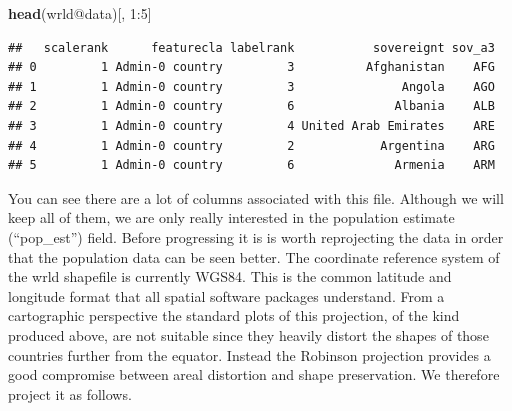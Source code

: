 \documentclass[]{article}
\newenvironment{Shaded}{}{}
\newcommand{\KeywordTok}[1]{\textcolor[rgb]{0.00,0.44,0.13}{\textbf{{#1}}}}
\newcommand{\DecValTok}[1]{\textcolor[rgb]{0.25,0.63,0.44}{{#1}}}
\newcommand{\NormalTok}[1]{{#1}}
\begin{document}
\begin{Shaded}
\begin{Highlighting}[]
\KeywordTok{head}\NormalTok{(wrld@data)[, }\DecValTok{1}\NormalTok{:}\DecValTok{5}\NormalTok{]}
\end{Highlighting}
\end{Shaded}
\begin{verbatim}
##   scalerank      featurecla labelrank           sovereignt sov_a3
## 0         1 Admin-0 country         3          Afghanistan    AFG
## 1         1 Admin-0 country         3               Angola    AGO
## 2         1 Admin-0 country         6              Albania    ALB
## 3         1 Admin-0 country         4 United Arab Emirates    ARE
## 4         1 Admin-0 country         2            Argentina    ARG
## 5         1 Admin-0 country         6              Armenia    ARM
\end{verbatim}
You can see there are a lot of columns associated with this file.
Although we will keep all of them, we are only really interested in the
population estimate (``pop\_est'') field. Before progressing it is is
worth reprojecting the data in order that the population data can be
seen better. The coordinate reference system of the wrld shapefile is
currently WGS84. This is the common latitude and longitude format that
all spatial software packages understand. From a cartographic
perspective the standard plots of this projection, of the kind produced
above, are not suitable since they heavily distort the shapes of those
countries further from the equator. Instead the Robinson projection
provides a good compromise between areal distortion and shape
preservation. We therefore project it as follows.
\end{document}
